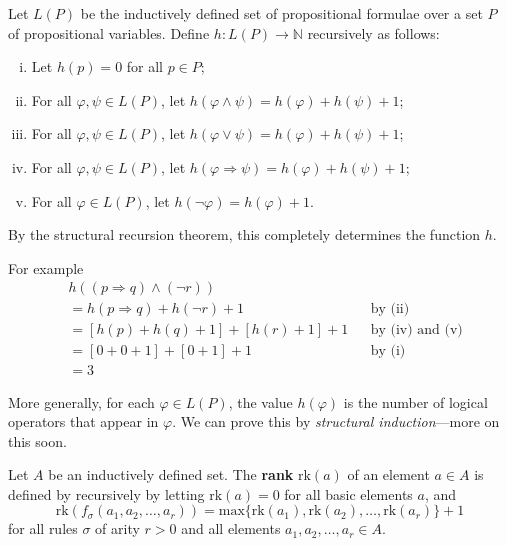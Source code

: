 \begin{example}
Let $L(P)$ be the inductively defined set of propositional formulae over a set $P$ of propositional variables. Define $h : L(P) \to \mathbb{N}$ recursively as follows:
\begin{enumerate}[(i)]
\item Let $h(p) = 0$ for all $p \in P$;
\item For all $\varphi, \psi \in L(P)$, let $h(\varphi \wedge \psi) = h(\varphi) + h(\psi) + 1$;
\item For all $\varphi, \psi \in L(P)$, let $h(\varphi \vee \psi) = h(\varphi) + h(\psi) + 1$;
\item For all $\varphi, \psi \in L(P)$, let $h(\varphi \Rightarrow \psi) = h(\varphi) + h(\psi) + 1$;
\item For all $\varphi \in L(P)$, let $h(\neg \varphi) = h(\varphi) + 1$.
\end{enumerate}
By the structural recursion theorem, this completely determines the function $h$.

For example
\begin{align*}
& h((p \Rightarrow q) \wedge (\neg r)) && \\
&= h(p \Rightarrow q) + h(\neg r) + 1 && \text{by (ii)} \\
&= [h(p) + h(q) + 1] + [h(r) + 1] + 1 && \text{by (iv) and (v)} \\
&= [0+0+1] + [0+1] + 1 && \text{by (i)} \\
&= 3
\end{align*}

More generally, for each $\varphi \in L(P)$, the value $h(\varphi)$ is the number of logical operators that appear in $\varphi$. We can prove this by \textit{structural induction}---more on this soon.
\end{example}

\begin{definition}
\label{defRank}
Let $A$ be an inductively defined set. The \textbf{rank} $\mathrm{rk}(a)$  of an element $a \in A$ is defined by recursively by letting $\mathrm{rk}(a) = 0$ for all basic elements $a$, and
\[ \mathrm{rk}(f_{\sigma}(a_1,a_2,\dots,a_r)) = \mathrm{max} \{ \mathrm{rk}(a_1), \mathrm{rk}(a_2),\dots, \mathrm{rk}(a_r) \} + 1 \]
for all rules $\sigma$ of arity $r>0$ and all elements $a_1,a_2,\dots,a_r \in A$.
\end{definition}

